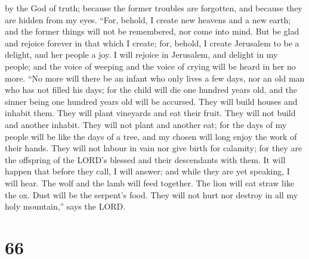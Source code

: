 by the God of truth; because the former troubles are forgotten, and
because they are hidden from my eyes.  ``For, behold, I
create new heavens and a new earth; and the former things will not be
remembered, nor come into mind.  But be glad and rejoice
forever in that which I create; for, behold, I create Jerusalem to be a
delight, and her people a joy.  I will rejoice in
Jerusalem, and delight in my people; and the voice of weeping and the
voice of crying will be heard in her no more.  ``No more
will there be an infant who only lives a few days, nor an old man who
has not filled his days; for the child will die one hundred years old,
and the sinner being one hundred years old will be accursed.
 They will build houses and inhabit them. They will plant
vineyards and eat their fruit.  They will not build and
another inhabit. They will not plant and another eat; for the days of my
people will be like the days of a tree, and my chosen will long enjoy
the work of their hands.  They will not labour in vain nor
give birth for calamity; for they are the offspring of the LORD's
blessed and their descendants with them.  It will happen
that before they call, I will answer; and while they are yet speaking, I
will hear.  The wolf and the lamb will feed together. The
lion will eat straw like the ox. Dust will be the serpent's food. They
will not hurt nor destroy in all my holy mountain,'' says the LORD.

\hypertarget{section-62}{%
\section{66}\label{section-62}}

